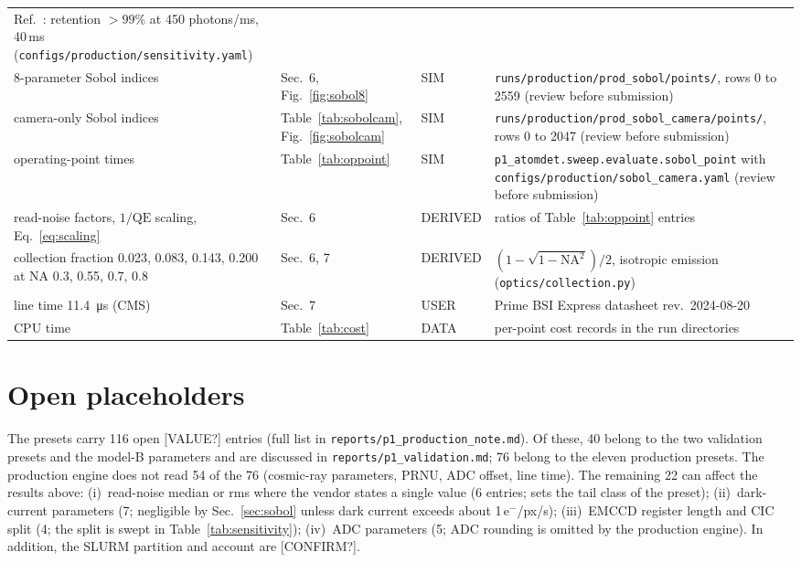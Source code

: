 \documentclass[11pt,a4paper]{article}
\newcommand{\file}[1]{\nolinkurl{#1}}
\newcommand{\elec}{e$^-$}
\begin{document}
{\begin{tabularx}{\textwidth}{@{}p{4.9cm} >{\raggedright\arraybackslash}p{2.0cm} >{\raggedright\arraybackslash}p{1.6cm} L@{}}
Ref.~\cite{picken}: retention $> 99\%$ at 450 photons/ms, 40\,ms (\file{configs/production/sensitivity.yaml}) \\
8-parameter Sobol indices & Sec.~6, Fig.~\ref{fig:sobol8} & SIM & \file{runs/production/prod_sobol/points/}, rows 0 to 2559 (review before submission) \\
camera-only Sobol indices & Table~\ref{tab:sobolcam}, Fig.~\ref{fig:sobolcam} & SIM &
\file{runs/production/prod_sobol_camera/points/}, rows 0 to 2047 (review before submission) \\
operating-point times & Table~\ref{tab:oppoint} & SIM &
\file{p1_atomdet.sweep.evaluate.sobol_point} with \file{configs/production/sobol_camera.yaml} (review before submission) \\
read-noise factors, $1/\mathrm{QE}$ scaling, Eq.~\eqref{eq:scaling} & Sec.~6 & DERIVED & ratios of Table~\ref{tab:oppoint} entries \\
collection fraction 0.023, 0.083, 0.143, 0.200 at NA 0.3, 0.55, 0.7, 0.8 & Sec.~6, 7 & DERIVED &
$(1-\sqrt{1-\mathrm{NA}^2})/2$, isotropic emission (\file{optics/collection.py}) \\
line time \SI{11.4}{\micro\second} (CMS) & Sec.~7 & USER & Prime BSI Express datasheet rev.\ 2024-08-20 \\
CPU time & Table~\ref{tab:cost} & DATA & per-point cost records in the run directories \\
\bottomrule
\end{tabularx}
}

\section{Open placeholders}

The presets carry 116 open [VALUE?] entries (full list in \file{reports/p1_production_note.md}). Of
these, 40 belong to the two validation presets and the model-B parameters and are discussed in
\file{reports/p1_validation.md}; 76 belong to the eleven production presets. The production engine does
not read 54 of the 76 (cosmic-ray parameters, PRNU, ADC offset, line time). The remaining 22 can affect
the results above: (i)~read-noise median or rms where the vendor states a single value (6 entries; sets
the tail class of the preset); (ii)~dark-current parameters (7; negligible by Sec.~\ref{sec:sobol}
unless dark current exceeds about 1\,\elec/px/s); (iii)~EMCCD register length and CIC split (4; the
split is swept in Table~\ref{tab:sensitivity}); (iv)~ADC parameters (5; ADC rounding is omitted by the
production engine). In addition, the SLURM partition and account are [CONFIRM?].
\end{document}
